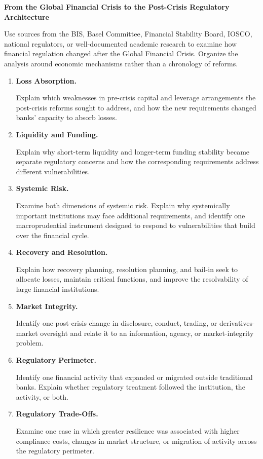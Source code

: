 \textbf{From the Global Financial Crisis to the Post-Crisis Regulatory Architecture}

Use sources from the BIS, Basel Committee, Financial Stability Board, IOSCO, national regulators, or well-documented academic research to examine how financial regulation changed after the Global Financial Crisis. Organize the analysis around economic mechanisms rather than a chronology of reforms.

\begin{enumerate}

\item \textbf{Loss Absorption.}

Explain which weaknesses in pre-crisis capital and leverage arrangements the post-crisis reforms sought to address, and how the new requirements changed banks' capacity to absorb losses.

\item \textbf{Liquidity and Funding.}

Explain why short-term liquidity and longer-term funding stability became separate regulatory concerns and how the corresponding requirements address different vulnerabilities.

\item \textbf{Systemic Risk.}

Examine both dimensions of systemic risk. Explain why systemically important institutions may face additional requirements, and identify one macroprudential instrument designed to respond to vulnerabilities that build over the financial cycle.

\item \textbf{Recovery and Resolution.}

Explain how recovery planning, resolution planning, and bail-in seek to allocate losses, maintain critical functions, and improve the resolvability of large financial institutions.

\item \textbf{Market Integrity.}

Identify one post-crisis change in disclosure, conduct, trading, or derivatives-market oversight and relate it to an information, agency, or market-integrity problem.

\item \textbf{Regulatory Perimeter.}

Identify one financial activity that expanded or migrated outside traditional banks. Explain whether regulatory treatment followed the institution, the activity, or both.

\item \textbf{Regulatory Trade-Offs.}

Examine one case in which greater resilience was associated with higher compliance costs, changes in market structure, or migration of activity across the regulatory perimeter.

\end{enumerate}


